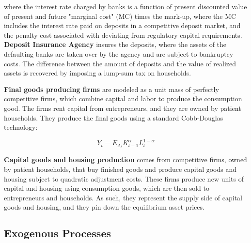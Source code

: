 \documentclass[12pt]{article}
\numberwithin{equation}{section}
\begin{document}
where the interest rate charged by banks is a function of present discounted value of present and future "marginal cost" (MC) times the mark-up, where the MC includes the interest rate paid on deposits in a competitive deposit market, and the penalty cost associated with deviating from regulatory capital requirements.  
\textbf{Deposit Insurance Agency} insures the deposits, where the assets of the defaulting banks are taken over by the agency and are subject to bankruptcy costs. The difference between the amount of deposits and the value of realized assets is recovered by imposing a lump-sum tax on households. 

\textbf{Final goods producing firms} are modeled as a unit mass of perfectly competitive firms, which combine capital and labor to produce the consumption good. The firms rent capital from entrepreneurs, and they are owned by patient households. They produce the final goods using a standard Cobb-Douglas technology: 

\begin{equation}
Y_{t}=E_{A_{t}} K^{\alpha}_{t-1}L^{1-\alpha}_{t}
\end{equation}

\textbf{Capital goods and housing production } comes from competitive firms, owned by patient households,  that buy finished goods and produce capital goods and housing subject to quadratic adjustment costs. These firms produce new units of capital and housing using consumption goods, which are then sold to entrepreneurs and households. As such, they represent the supply side of capital goods and housing, and they pin down the equilibrium asset prices. 

\subsection{Exogenous Processes}
\end{document}
